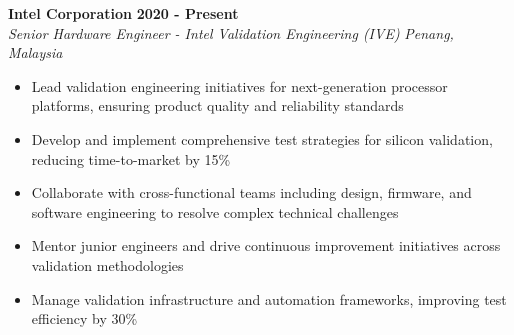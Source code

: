 \textbf{Intel Corporation} \hfill \textbf{2020 - Present} \\
\textit{Senior Hardware Engineer - Intel Validation Engineering (IVE)} \hfill \textit{Penang, Malaysia} \\
\vspace{-0.4mm}
\begin{itemize}[leftmargin=0.5cm, label={\textbullet}]
\item Lead validation engineering initiatives for next-generation processor platforms, ensuring product quality and reliability standards
\item Develop and implement comprehensive test strategies for silicon validation, reducing time-to-market by 15\%
\item Collaborate with cross-functional teams including design, firmware, and software engineering to resolve complex technical challenges
\item Mentor junior engineers and drive continuous improvement initiatives across validation methodologies
\item Manage validation infrastructure and automation frameworks, improving test efficiency by 30\%
\end{itemize}
\vspace{0.2mm}